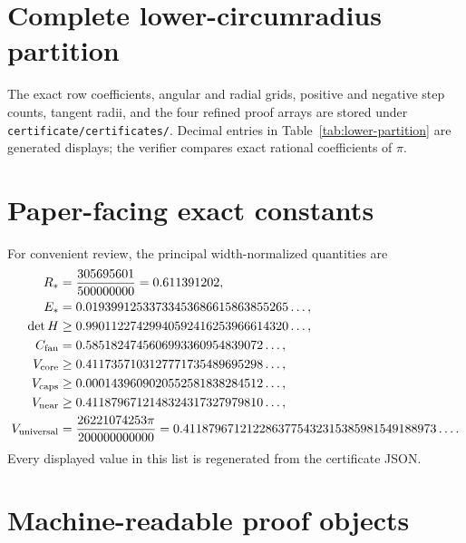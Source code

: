 \documentclass[11pt,reqno]{amsart}
\theoremstyle{remark}
\begin{document}
\appendix

\section{Complete lower-circumradius partition}
\label{app:lower-table}



The exact row coefficients, angular and radial grids, positive and negative
step counts, tangent radii, and the four refined proof arrays are stored under
\texttt{certificate/certificates/}.  Decimal entries in
Table~\ref{tab:lower-partition} are generated displays; the verifier compares
exact rational coefficients of $\pi$.

\section{Paper-facing exact constants}
\label{app:constants}

For convenient review, the principal width-normalized quantities are
\begin{align*}
R_*&=\frac{305695601}{500000000}=0.611391202,\\
E_*&=0.01939912533733453686615863855265\ldots,\\
\det H&\ge0.99011227429940592416253966614320\ldots,\\
C_{\rm fan}&=0.5851824745606993360954839072\ldots,\\
V_{\rm core}&\ge0.4117357103127771735489695298\ldots,\\
V_{\rm caps}&\ge0.0001439609020552581838284512\ldots,\\
V_{\rm near}&\ge0.4118796712148324317327979810\ldots,\\
V_{\rm universal}&=\frac{26221074253\pi}{200000000000}
=0.4118796712122863775432315385981549188973\ldots.
\end{align*}
Every displayed value in this list is regenerated from the certificate JSON.

\section{Machine-readable proof objects}
\label{app:objects}
\end{document}
